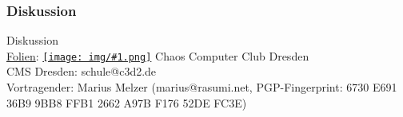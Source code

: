 \documentclass[12pt, xcolor={svgnames,table}]{beamer}
\newcommand{\cc}[1]{\texttt{[image: img/\#1.png]}\hspace{1mm}}
\begin{document}
\begin{frame}
  \frametitle{Diskussion}
  \begin{center}
    {\Large Diskussion}\\
    \vspace{4mm}
    \href{https://github.com/c3d2/cms}{Folien}: \href{https://creativecommons.org/licenses/by-sa/4.0/}{\cc{by-sa}} Chaos Computer Club Dresden \\
    CMS Dresden: schule@c3d2.de\\
    \vspace{3mm}
    Vortragender: Marius Melzer (marius@rasumi.net, PGP-Fingerprint: 6730 E691 36B9 9BB8 FFB1 2662 A97B F176 52DE FC3E)
  \end{center}
\end{frame}
\end{document}
